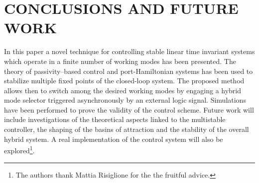 \section{CONCLUSIONS AND FUTURE WORK}
In this paper a novel technique for controlling stable linear time invariant systems which operate in a finite number of working modes has been presented. 
The theory of passivity--based control and port-Hamiltonian systems has been used to stabilize multiple fixed points of the closed-loop system. The proposed method allows then to switch among the desired working modes by engaging a hybrid mode selector triggered asynchronously by an external logic signal. Simulations have been performed to prove the validity of the control scheme.
Future work will include investigations of the theoretical aspects linked to the multistable controller, the shaping of the basins of attraction and the stability of the overall hybrid system. A real implementation of the control system will also be explored\footnote{The authors thank Mattia Risiglione for the the fruitful advice.}.

